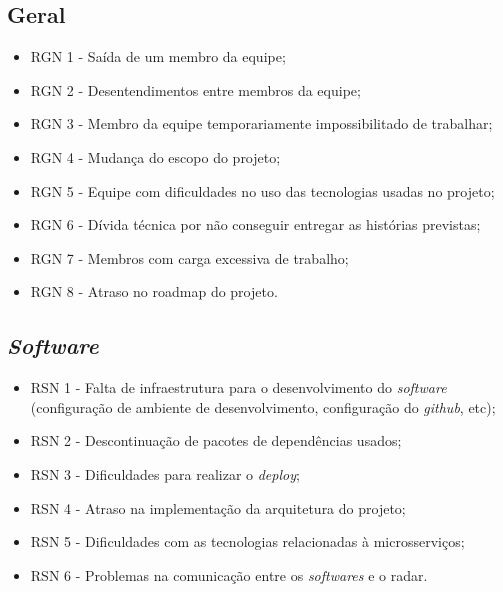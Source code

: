 \subsection{Geral}

\begin{itemize}
    \item RGN 1 - Saída de um membro da equipe;
    \item RGN 2 - Desentendimentos entre membros da equipe;
    \item RGN 3 - Membro da equipe temporariamente impossibilitado de trabalhar;
    \item RGN 4 - Mudança do escopo do projeto;
    \item RGN 5 - Equipe com dificuldades no uso das tecnologias usadas no projeto;
    \item RGN 6 - Dívida técnica por não conseguir entregar as histórias previstas;
    \item RGN 7 - Membros com carga excessiva de trabalho;
    \item RGN 8 - Atraso no roadmap do projeto.
\end{itemize}

\subsection{\emph{Software}}
\begin{itemize}
    \item RSN 1 - Falta de infraestrutura para o desenvolvimento do \emph{software} (configuração de ambiente de desenvolvimento, configuração do \emph{github}, etc);
    \item RSN 2 - Descontinuação de pacotes de dependências usados;
    \item RSN 3 - Dificuldades para realizar o \emph{deploy};
    \item RSN 4 - Atraso na implementação da arquitetura do projeto;
    \item RSN 5 - Dificuldades com as tecnologias relacionadas à microsserviços;
    \item RSN 6 - Problemas na comunicação entre os \emph{softwares} e o radar.
\end{itemize}

